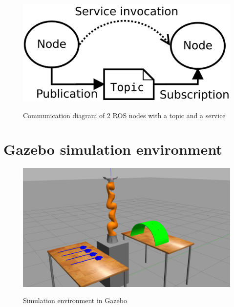 \begin{center}
\begin{figure}[!htb]
\centering
\includegraphics{images/ROS_basic_concepts_topics_nodes.png}\\
\caption{Communication diagram of 2 ROS nodes with a topic and a service}
\end{figure}
\end{center}


\section{Gazebo simulation environment}

\begin{center}
\begin{figure}[!htb]
\centering
\includegraphics[width=12cm]{images/gazebo-sim1.png}\\
\caption{Simulation environment in Gazebo}
\end{figure}
\end{center}

